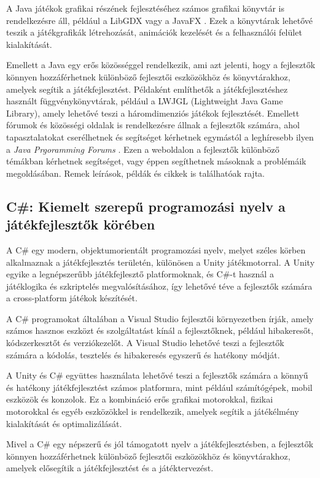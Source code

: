 A Java játékok grafikai részének fejlesztéséhez számos grafikai könyvtár is rendelkezésre áll, például a LibGDX \cite{libgdx} vagy a JavaFX \cite{javafx}. Ezek a könyvtárak lehetővé teszik a játékgrafikák létrehozását, animációk kezelését és a felhasználói felület kialakítását.

Emellett a Java egy erős közösséggel rendelkezik, ami azt jelenti, hogy a fejlesztők könnyen hozzáférhetnek különböző fejlesztői eszközökhöz és könyvtárakhoz, amelyek segítik a játékfejlesztést. Példaként említhetők a játékfejlesztéshez használt függvénykönyvtárak, például a LWJGL (Lightweight Java Game Library), amely lehetővé teszi a háromdimenziós játékok fejlesztését. Emellett fórumok és közösségi oldalak is rendelkezésre állnak a fejlesztők számára, ahol tapasztalatokat cserélhetnek és segítséget kérhetnek egymástól a leghíresebb ilyen a \textsl{Java Prgoramming Forums} \cite{JPF}. Ezen a weboldalon a fejlesztők különböző témákban kérhetnek segítséget, vagy éppen segíthetnek másoknak a problémáik megoldásában. Remek leírások, példák és cikkek is találhatóak rajta.
\subsection{C\#: Kiemelt szerepű programozási nyelv a játékfejlesztők körében}

 A C\# \cite{csharp-doc} egy modern, objektumorientált programozási nyelv, melyet széles körben alkalmaznak a játékfejlesztés területén, különösen a Unity játékmotorral. \cite{unity-cs} A Unity egyike a legnépszerűbb játékfejlesztő platformoknak, és C\#-t használ a játéklogika és szkriptelés megvalósításához, így lehetővé téve a fejlesztők számára a cross-platform játékok készítését.

A C\# programokat általában a Visual Studio\cite{vs} fejlesztői környezetben írják, amely számos hasznos eszközt és szolgáltatást kínál a fejlesztőknek, például hibakeresőt, kódszerkesztőt és verziókezelőt. A Visual Studio lehetővé teszi a fejlesztők számára a kódolás, tesztelés és hibakeresés egyszerű és hatékony módját.

A Unity és C\# együttes használata lehetővé teszi a fejlesztők számára a könnyű és hatékony játékfejlesztést számos platformra, mint például számítógépek, mobil eszközök és konzolok. Ez a kombináció erős grafikai motorokkal, fizikai motorokkal és egyéb eszközökkel is rendelkezik, amelyek segítik a játékélmény kialakítását és optimalizálását.

Mivel a C\# egy népszerű és jól támogatott nyelv a játékfejlesztésben, a fejlesztők könnyen hozzáférhetnek különböző fejlesztői eszközökhöz és könyvtárakhoz, amelyek elősegítik a játékfejlesztést és a játéktervezést.
